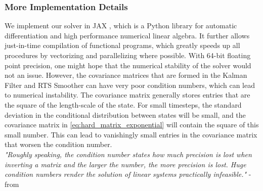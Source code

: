 \subsubsection*{More Implementation Details}
We implement our solver in JAX \cite{jax}, which is a Python library for automatic differentiation and high performance numerical linear algebra. It further allows just-in-time compilation of functional programs, which greatly speeds up all procedures by vectorizing and parallelizing where possible. With 64-bit floating point precision, one might hope that the numerical stability of the solver would not an issue. However, the covariance matrices that are formed in the Kalman Filter and RTS Smoother can have very poor condition numbers, which can lead to numerical instability. The covariance matrix generally stores entries that are the square of the length-scale of the state. For small timesteps, the standard deviation in the conditional distribution between states will be small, and the covariance matrix in \ref{eq:hard_matrix_exponential} will contain the square of this small number. This can lead to vanishingly small entries in the covariance matrix that worsen the condition number. \\
\textit{"Roughly speaking, the condition number states how much precision is lost when inverting a matrix and the larger the number, the more precision is lost. Huge condition numbers render the solution of linear systems practically infeasible."} - from \cite{nicoThesis}

